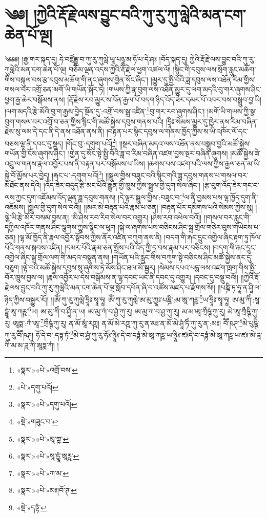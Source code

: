 \chapter{༄༅། །ཀྱེའི་རྡོ་རྗེ་ལས་བྱུང་བའི་ཀུ་རུ་ཀུ་ལླེའི་མན་ངག་ཆེན་པོ་ལྔ།}༄༅༅། །རྒྱ་གར་སྐད་དུ། ཧེ་བཛྲོདྦྷ་བ་ཀུ་རུ་ཀུལླེ་ཡཱ་པཉྩ་མ་ཧོ་པ་དེ་ཤཿ །བོད་སྐད་དུ། ཀྱེའི་རྡོ་རྗེ་ལས་བྱུང་བའི་ཀུ་རུ་ཀུལླེའི་མན་ངག་ཆེན་པོ་ལྔ། བཅོམ་ལྡན་འདས་ཀྱེའི་རྡོ་རྗེ་ལ་ཕྱག་འཚལ་ལོ། །སྙིང་གི་དབུས་ལས་སྲོག་རླུང་མཆོག་གིས་བསྐུལ་བས་རྩ་དབུས་མཆོག་གི་ནང་ཞུགས་གྱེན་སོང་ཞིང་། །མྱུར་དུ་སྤྱི་བོའི་ཟླ་དབུས་ལས་འཐོན་རིམ་གྱིས་གསལ་བར་འགྲོ་ཅན་མགོ་ཡི་གཡོན་སྐོར་ཏེ། །གཡས་ཀྱི་རྣ་བུག་ལས་འཐོན་མྱུར་དུ་ལག་མདའི་བུ་གར་ཞུགས་ཤིང་ཕྱག་རྒྱ་ཆེར་བསྒོམས་ནས། །རྡོ་རྗེས་རབ་མྱུར་ས་བོན་རྒྱལ་པོ་བདག་ཉིད་འོད་ཟེར་དམར་པོ་འབར་བས་བསྒྲུབ་བྱ་ཡི། །ལག་མདའི་རྩེ་མོའི་བུ་ག་རྒྱས་བྱེད་སྔོན་དུ་:འགྲོ་བས་སྒྲ་འཛིན་\footnote{«སྣར་»«པེ་»འགྲོ་བས་}བུ་གར་རབ་ཞུགས་ཤིང་། །མགོ་ཡི་གཡས་ཀྱི་སྣ་བུག་གསལ་བར་འགྲོ་བ་ཅན་གྱིས་སྙིང་གི་མཚོ་སྐྱེས་དབུས་གནས་པའི། །ཧྲཱིཿ་སེམས་མྱུར་དུ་ཁྱེར་ནས་རིམ་བཞིན་རྗེས་སུ་ལམ་དེ་དང་ནི་དེ་ནས་འཐོན་ནས་ནི། །བརྟན་པར་སྙིང་དབུས་ལ་གནས་ཁྱོད་ཀྱིས་ས་ཡི་འཁོར་ལོ་དང་བཅས་ལྷ་ནི་དབང་དུ་སྡུད། །གོང་བུ་:དགུག་པའོ།\footnote{«པེ་»དགུ་པའོ།}། །།སྔར་བཞིན་མདའ་ལས་འཐོན་ནས་བསྒྲུབ་བྱའི་མཚོ་སྐྱེས་གཡོན་གྱི་ངོས་ཞུགས་ཤིང་། །གྱེན་དུ་སོང་སྟེ་སྤྱི་བོའི་ཟླ་བ་རིམ་བཞིན་འཛག་བྱས་སྔར་བཞིན་ཞུགས། །མཚོ་སྐྱེས་ཟེ་འབྲུ་ལ་གནས་རྣལ་འབྱོར་པས་ནི་བརྟན་པར་བསྒོམས་པ་ཡིས། །ཆགས་པས་འཛག་པའི་ལས་ཀྱིས་རྒྱལ་ཅན་མ་ཡི་སྐྱེ་བོ་མྱོས་པར་བྱེད། །རྐང་པ་:དགུག་པའོ།\footnote{«སྣར་»«པེ་»དགུ་པའོ།}། །།སྦྲུལ་གྱིས་བཟུང་བའི་སྙིང་གའི་ཟླ་དབུས་གནས་པ་གསལ་བར་མཐོང་ནས་དེའི། །འོད་ཟེར་བདུད་རྩི་མང་པོའི་རྒྱུན་གྱི་ཁྲུས་ཀྱིས་སྦྲུལ་གྱི་དུག་སེལ་ཞིང་། །རྩ་བུག་འོད་ཟེར་གང་བ་ལས་ཀྱང་དུག་འཇོམས་འོད་ལྡན་ཟླ་དབུས་གནས། །དེ་ལྟར་སྦྲུལ་གྱིས་:བཟུང་བ་\footnote{«སྡེ་»གཟུང་བ་}ལ་ནི་བྱམས་པས་ལྷ་ཁྱོད་དུག་ནི་འཇོམས། །སྦྲུལ་གྱི་དུག་སེལ་བའོ།། །།མར་མེ་བརྟན་པའི་རྣམ་པ་ཅན། །བརྟན་པོར་དམིགས་པའི་སེམས་ཀྱིས་སུ། །ལྕེ་ཡི་རྩེ་མོར་བསམ་བྱས་ན། །མི་ཤེས་རབ་རིབ་སེལ་བར་འགྱུར། །ཤེས་རབ་འཕེལ་བའོ།། །།གསལ་བར་རླུང་གི་དཀྱིལ་འཁོར་གནས་ཤིང་ལྕགས་ཀྱུས་སྙིང་ལ་ཕུག །སྐེ་ལ་ཞགས་པས་བཅིངས་ཤིང་སྐྲ་གྲོལ་གཅེར་བུས་གཡེངས་པ་ཅན། །ལྷ་མོ་ཁྱོད་ནི་རྣལ་འབྱོར་སྟོབས་ཀྱིས་ནོར་འཛིན་བཀུག་ནས་ནི། །བདག་གི་རྐང་དྲུང་འགྱེལ་ཞིང་རྟག་ཏུ་ཁོལ་པོའི་གནས་སྐབས་འཛིན། །དམར་པོའི་རྣམ་ཅན་སྤྲོས་པའི་འོད་ཀྱི་དྲ་བས་རྣམ་པར་བཅིངས། །བདག་གི་རྐང་དྲུང་འགྱེལ་ཞིང་སྐྲ་གྲོལ་ལག་གི་མདའ་བསྣུན་ནས། །གཡོན་པའི་རླུང་གིས་བཀུག་སྟེ་བཅིངས་ཤིང་མཚོ་སྐྱེས་ནང་དུ་བཅུག །ལྟེ་བའི་མཚོ་སྐྱེས་དབུས་སུ་ཞུགས་ཏེ་མོས་ཤིང་ཐལ་མོ་སྦྱར། །སེམས་དཔའ་པདྨ་ལས་འཛག་ཁྲག་གིས་སྤྱི་བོར་ཁྲུས་བྱས་ལ། །རྣལ་འབྱོར་པ་དེས་བསྒོམས་ན་ལྷ་དབང་ཡང་ནི་དབང་དུ་འགྱུར། །དབང་དུ་བསྡུ་བའོ།། །།ཀྱེའི་རྡོ་རྗེ་ལས་བྱུང་བའི་ཀུ་རུ་ཀུལླེའི་མན་ངག་ཆེན་པོ་ལྔ་སློབ་དཔོན་ཞི་བ་འཚོས་མཛད་པ་རྫོགས་སོ།། །།པཎྜི་ཏ་ཧཱ་ན་ཤཱི་ལ་ཉིད་ཀྱིས་བསྒྱུར་རོ།། །།ཨོཾ་ཀུ་རུ་ཀུལླེ་ཧྲཱིཿ་སྭཱ་ཧཱ། ཨོཾ་ཀུ་རུ་ཀུལླེ་ཨ་མུ་ཀྱཱཿ་པཎྜི་:མ་ཨཱ་ཀཪྵ་\footnote{«སྣར་»«པེ་»མཱ་ཀྵ་}ཡ་ཧྲཱིཿ་སྭཱ་ཧཱ། ཨ་མུ་ཀིཾ་:སཱ་དྷྱཱཾ་ཨཱ་ཀཪྵ་\footnote{«སྣར་»«པེ་»སཱ་དྱཱཾ་ཨཱཪྵ་}ཡ། ཨ་མུ་ཀིཾ་བ་ཤཱིཾ་ན་ཡ། ཨ་མུ་ཀཾ་བ་ཤྱཾ་ཀུ་རུ། ཨ་མུ་ཀ་བ་ཤྱ་ཀུ་རུ། མ་མ་ཨཱ་ཀྲྀཥྚཾ་ཀུ་རུ། མེ་ཨཱ་ཀྲྀཥྚི་ཀུ་རུ། ཨཱཏྨ་:ཀཾ་ཨཱ་\footnote{«སྣར་»«པེ་»ཀ་མ་}ཀྲྀཥྚཾ་ཀུ་རུ། ན་མོ་མཱཾ་རཀྵ། ན་མོ་མེ་རཀྵ་ཀུ་རུ་ན་མཿ་ན་མོ་མེ་ཤཱཾ་ཏིཾ་ཀུ་རུ་ན་:མཿ། བཽ་ཥཊ་\footnote{«སྣར་»«པེ་»མཿ།བོ་ཊ་}མེ་པུཥྚི་ཀུ་རུ་བཽ་ཥཊ། ཧོ་དེ་བ་:དཏྟ་ཏཾ་\footnote{«སྡེ་»དཏྟཾ་}མེ་བ་ཤྱཾ་ཀུ་རུ་ཧོཿ་ཧྲཱིཿ་དེ་བ་དཏྟཾ་མེ་ཨཱ་ཀཪྵ་ཡ་ཧྲཱིཿ་ཛཿདེ་བ་དཏྟཾ་མེ་ཨཱ་ཀཪྵ་ཡ་ཛཿ་མེ་ཌཱ་ཀི་མ་མ་ཌཱ་ཀི་ཨཱཏྨ་ཀཾ། ། 